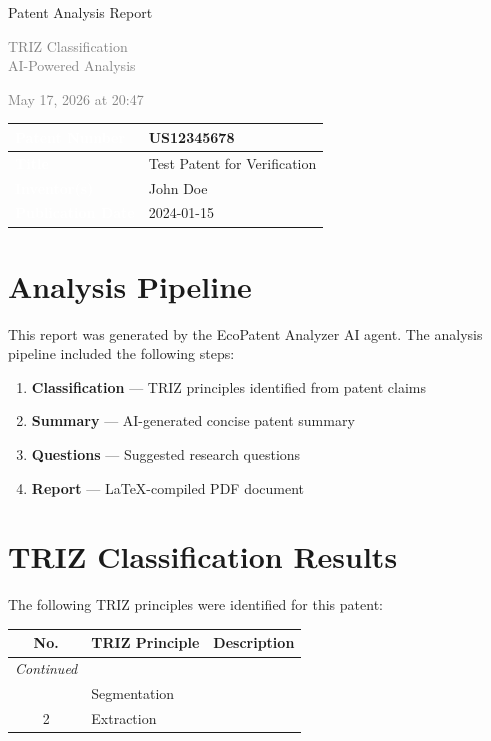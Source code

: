 \documentclass{report}%
\begin{document}
%
\normalsize%
\pagestyle{fancy}%
\thispagestyle{empty}%
\begin{center}%
\vspace*{4cm}%
\begin{Huge}%
\textcolor{primary}{Patent Analysis Report}%
\end{Huge}%
\linebreak%
\vspace{0.5cm}%
\begin{Large}%
\textcolor{gray}{TRIZ Classification \\ AI-Powered Analysis}%
\end{Large}%
\linebreak%
\vspace{0.3cm}%
\begin{large}%
\textcolor{gray}{May 17, 2026 at 20:47}%
\end{large}%
\vspace{2cm}%
\end{center}%
\begin{tabular}{|p{4cm}|p{10cm}|}%
\hline%
\textbf{\textcolor{white}{Patent Number}}&US12345678\\%
\hline%
\textbf{\textcolor{white}{Title}}&Test Patent for Verification\\%
\hline%
\textbf{\textcolor{white}{Inventor(s)}}&John Doe\\%
\hline%
\textbf{\textcolor{white}{Publication Date}}&2024-01-15\\%
\hline%
\end{tabular}%
\newpage%
\section*{Analysis Pipeline}%
\label{sec:AnalysisPipeline}%
This report was generated by the EcoPatent Analyzer AI agent. The analysis pipeline included the following steps:%
\begin{enumerate}%
\item \textbf{Classification} --- TRIZ principles identified from patent claims%
\item \textbf{Summary} --- AI-generated concise patent summary%
\item \textbf{Questions} --- Suggested research questions%
\item \textbf{Report} --- LaTeX-compiled PDF document%
\end{enumerate}

%
\section*{TRIZ Classification Results}%
\label{sec:TRIZClassificationResults}%
The following TRIZ principles were identified for this patent:%
\vspace{0.3cm}%
\begin{longtable}{|c|p{4cm}|p{8cm}|}%
\hline%
\textbf{No.}&\textbf{TRIZ Principle}&\textbf{Description}\\%
\hline%
\endhead%
\hline%
\textit{Continued}&&\\%
\hline%
\endfoot%
1&Segmentation&\\%
\hline%
2&Extraction&\\%
\hline%
\end{longtable}
\end{document}
